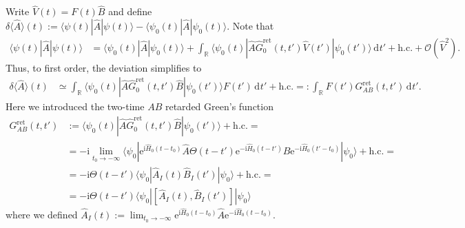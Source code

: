 \documentclass[english, parskip=full]{scrartcl}
\renewcommand{\bra}{}
\renewcommand{\braket}{}
\newcommand{\intr}{}
\newcommand{\kla}{}
\newcommand{\klam}{}
\newcommand{\tecxt}{}
\renewcommand{\i}{\text{i}}
\newcommand{\e}{\text{e}}
\begin{document}
Write $\hat{V}(t) = F(t) \hat{B}$ and define $\delta \bra\langle \hat{A} \rangle(t) := \braket\langle \psi(t) | \hat{A} | \psi(t) \rangle - \braket\langle \psi_0(t) | \hat{A} | \psi_0(t) \rangle$.
Note that
\begin{align}
\braket\langle \psi(t) | \hat{A} | \psi(t) \rangle &= \langle \psi_0(t) | \hat{A} | \psi_0(t) \rangle + \intr\int_{\mathbb{R}^{ }} \braket\langle \psi_0(t) | \hat{A} \hat{G}_0^\tecxt\text{ret}(t,t') \hat{V}(t') | \psi_0(t') \rangle  \, \mathrm{d}^{ }t' + \tecxt\text{h.c.} + \mathcal{O}\kla\left( \hat{V}^2 \right).
\end{align}
Thus, to first order, the deviation simplifies to
\begin{align}
\delta \bra\langle \hat{A} \rangle (t) &\simeq \intr\int_{\mathbb{R}^{ }} \braket\langle \psi_0(t) | \hat{A} \hat{G}_0^\tecxt\text{ret}(t,t') \hat{B} | \psi_0(t') \rangle F(t') \, \mathrm{d}^{ }t' + \tecxt\text{h.c.} =: \intr\int_{\mathbb{R}^{ }} F(t') G_{AB}^\tecxt\text{ret}(t,t') \, \mathrm{d}^{ }t'.
\end{align}
Here we introduced the two-time $AB$ retarded Green's function
\begin{align}
G_{AB}^\tecxt\text{ret}(t,t') &:= \braket\langle \psi_0(t) | \hat{A} \hat{G}_0^\tecxt\text{ret}(t,t') \hat{B} | \psi_0(t') \rangle + \tecxt\text{h.c.} = \\
&= -\i \lim_{t_0 \rightarrow -\infty} \braket\langle \psi_0 | \e^{\i\hat{H}_0 (t - t_0)} \hat{A} \Theta(t-t') \e^{-\i \hat{H}_0(t - t')} \hat{B} \e^{-\i\hat{H}_0(t' - t_0)} | \psi_0 \rangle + \tecxt\text{h.c.} = \\
&= -\i\Theta(t-t') \braket\langle \psi_0 | \hat{A}_I(t) \hat{B}_I(t') | \psi_0 \rangle + \tecxt\text{h.c.} = \\
&= -\i\Theta (t-t') \braket\langle \psi_0 | \klam\left[ \hat{A}_I(t), \hat{B}_I(t') \right] | \psi_0 \rangle
\end{align}
where we defined $\hat{A}_I(t) := \lim_{t_0\rightarrow -\infty} \e^{\i\hat{H}_0 (t-t_0)} \hat{A} \e^{-\i\hat{H}_0(t-t_0)}$.



\end{document}
